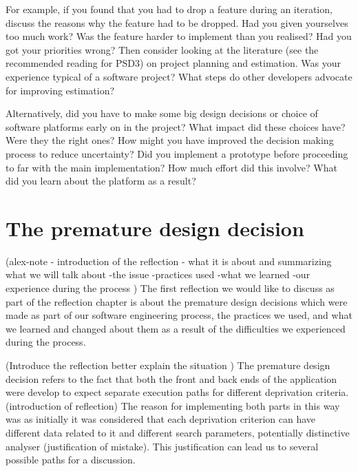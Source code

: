 \documentclass{l3proj}
\begin{document}
For example, if you found that you had to drop a feature during an iteration, discuss the reasons why the feature had to be dropped. Had you given yourselves too much work? Was the feature harder to implement than you realised? Had you got your priorities wrong? Then consider looking at the literature (see the recommended reading for PSD3) on project planning and estimation. Was your experience typical of a software project? What steps do other developers advocate for improving estimation?

Alternatively, did you have to make some big design decisions or choice of software platforms early on in the project? What impact did these choices have? Were they the right ones? How might you have improved the decision making process to reduce uncertainty? Did you implement a prototype before proceeding to far with the main implementation? How much effort did this involve? What did you learn about the platform as a result?

\section{The premature design decision}
\label{design}

(alex-note - introduction of the reflection - what it is about and summarizing what we will talk about
-the issue
-practices used
-what we learned
-our experience during the process
)
The first reflection we would like to discuss as part of the reflection chapter is about the premature design decisions which were made as part of our software engineering process, the practices we used, and what we learned and changed about them as a result of the difficulties we experienced during the process.

(Introduce the reflection better explain the situation )
The premature design decision refers to the fact that both the front and back ends of the application were develop to expect separate execution paths for different deprivation criteria.(introduction of reflection) The reason for implementing both parts in this way was as initially it was considered that each deprivation criterion can have different data related to it and different search parameters, potentially distinctive analyser (justification of mistake). This justification can lead us to several possible paths for a  discussion.
\end{document}
